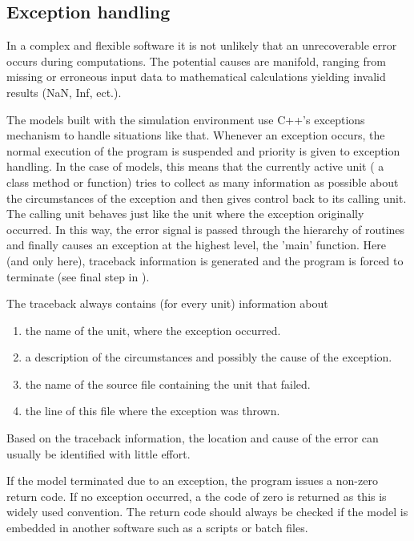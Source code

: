 \subsection{Exception handling} \label{sec:concept-compSteps-exceptionHandling}

In a complex and flexible software it is not unlikely that an unrecoverable error occurs during computations. The potential causes are manifold, ranging from missing or erroneous input data to mathematical calculations yielding invalid results (NaN, Inf, ect.).

The models built with the  simulation environment use C++'s exceptions mechanism to handle situations like that. Whenever an exception occurs, the normal execution of the program is suspended and priority is given to exception handling. In the case of  models, this means that the currently active unit (\ie{} a class method or function) tries to collect as many information as possible about the circumstances of the exception and then gives control back to its calling unit. The calling unit behaves just like the unit where the exception originally occurred. In this way, the error signal is passed through the hierarchy of routines and finally causes an exception at the highest level, the 'main' function. Here (and only here), traceback information is generated and the program is forced to terminate (see final step in ).

The traceback always contains (for every unit) information about
\begin{enumerate}
  \item the name of the unit, where the exception occurred.
  \item a description of the circumstances and possibly the cause of the exception.
  \item the name of the source file containing the unit that failed.
  \item the line of this file where the exception was thrown.
\end{enumerate}

Based on the traceback information, the location and cause of the error can usually be  identified with little effort.

If the model terminated due to an exception, the program issues a non-zero return code. If no exception occurred, a the code of zero is returned as this is widely used convention. The return code should always be checked if the model is embedded in another software such as a scripts or batch files.

